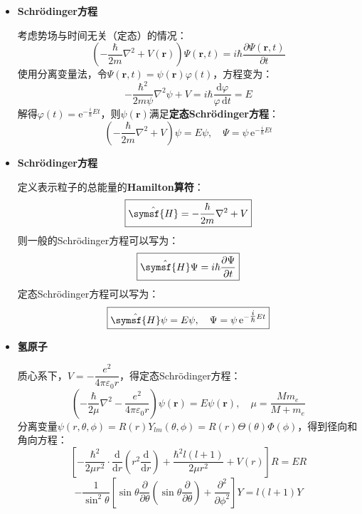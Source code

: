 \documentclass{beamer}
\renewcommand{\bm}{\symbf}
\renewcommand{\mathsf}{\symsf}
\renewcommand\epsilon{\varepsilon}
\renewcommand\mathsf{\symsf}
\newenvironment{slide}{
    \begin{frame}{\bfseries{\sectiontitle}}
}{
    \end{frame}
}
\begin{document}
\begin{slide}
    \begin{itemize}
        \item \textbf{Schrödinger方程}

        考虑势场与时间无关（定态）的情况：
        \[
            \left(-\frac{\hbar}{2m}\nabla^2 + V(\bm{r})\right)\Psi(\bm{r},t) = i\hbar\frac{\partial\Psi(\bm{r},t)}{\partial t}
        \]
        使用分离变量法，令$\Psi(\bm{r},t)=\psi(\bm{r})\varphi(t)$，方程变为：
        \[
            -\frac{\hbar^2}{2m\psi}\nabla^2\psi + V = i\hbar\frac{\mathrm{d}\varphi}{\varphi\,\mathrm{d}t} = E
        \]
        解得$\varphi(t)=\mathrm{e}^{-\tfrac{i}{\hbar}Et}$，则$\psi(\bm{r})$满足\textbf{定态Schrödinger方程}：
        \[
            \boxed{
            \left(-\frac{\hbar}{2m}\nabla^2 + V\right)\psi = E\psi,\quad \Psi = \psi\,\mathrm{e}^{-\tfrac{i}{\hbar}Et}
            }
        \]
    \end{itemize}
\end{slide}

\begin{slide}
    \begin{itemize}
        \item \textbf{Schrödinger方程}

        定义表示粒子的总能量的\textbf{Hamilton算符}：
        \[
            \boxed{
            \hat{\mathsf{H}} = -\frac{\hbar}{2m}\nabla^2 + V
            }
        \]
        则一般的Schrödinger方程可以写为：
        \[
            \boxed{
            \hat{\mathsf{H}}\Psi = i\hbar\frac{\partial\Psi}{\partial t}
            }
        \]
        定态Schrödinger方程可以写为：
        \[
            \boxed{
            \hat{\mathsf{H}}\psi = E\psi,\quad \Psi = \psi\,\mathrm{e}^{-\tfrac{i}{\hbar}Et}
            }
        \]
    \end{itemize}
\end{slide}

\begin{slide}
    \begin{itemize}
        \item \textbf{氢原子}

        质心系下，$V=-\dfrac{e^2}{4\pi\epsilon_0r}$，得定态Schrödinger方程：
        \[
            \left(-\frac{\hbar}{2\mu}\nabla^2-\frac{e^2}{4\pi\epsilon_0r}\right)\psi(\bm{r}) = E\psi(\bm{r}),\quad \mu = \frac{Mm_e}{M+m_e}
        \]
        分离变量$\psi(r,\theta,\phi)=R(r)Y_{lm}(\theta,\phi)=R(r)\Theta(\theta)\Phi(\phi)$，得到径向和角向方程：
        \[
            \left[-\frac{\hbar^2}{2\mu r^2} \cdot \frac{\mathrm{d}}{\mathrm{d}r}\left(r^2\frac{\mathrm{d}}{\mathrm{d}r}\right) + \frac{\hbar^2l(l+1)}{2\mu r^2} + V(r)\right]R = ER
        \]
        \[
            -\frac{1}{\sin^2\theta}\left[\sin\theta\frac{\partial}{\partial\theta}\left(\sin\theta\frac{\partial}{\partial\theta}\right) + \frac{\partial^2}{\partial\phi^2}\right]Y = l(l+1)Y
        \]
    \end{itemize}
\end{slide}
\end{document}

